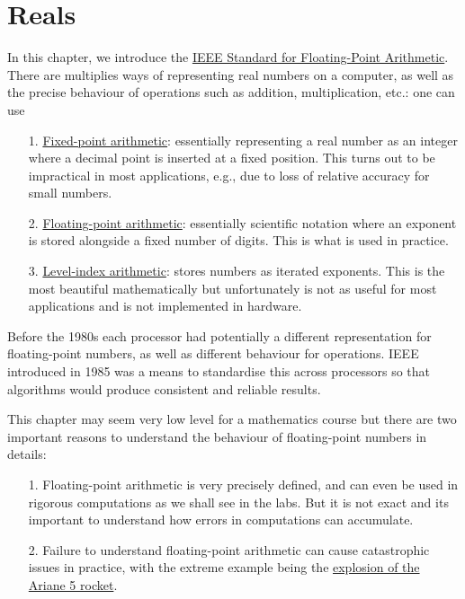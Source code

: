 
\section{Reals}
In this chapter, we introduce  the  \href{https://en.wikipedia.org/wiki/IEEE_754}{IEEE Standard for Floating-Point Arithmetic}. There are multiplies ways of representing real numbers on a computer, as well as  the precise behaviour of operations such as addition, multiplication, etc.: one can use

\begin{itemize}
\item[1. ] \href{https://en.wikipedia.org/wiki/Fixed-point_arithmetic}{Fixed-point arithmetic}: essentially representing a real number as an integer where a decimal point is inserted at a fixed position. This turns out to be impractical in most applications, e.g., due to loss of relative accuracy for small numbers.


\item[2. ] \href{https://en.wikipedia.org/wiki/Floating-point_arithmetic}{Floating-point arithmetic}: essentially scientific notation where an exponent is stored alongside a fixed number of digits. This is what is used in practice.


\item[3. ] \href{https://en.wikipedia.org/wiki/Symmetric_level-index_arithmetic}{Level-index arithmetic}: stores numbers as iterated exponents. This is the most beautiful mathematically but unfortunately is not as useful for most applications and is not implemented in hardware.

\end{itemize}
Before the 1980s each processor had potentially a different representation for  floating-point numbers, as well as different behaviour for operations.  IEEE introduced in 1985 was a means to standardise this across processors so that algorithms would produce consistent and reliable results.

This chapter may seem very low level for a mathematics course but there are two important reasons to understand the behaviour of floating-point numbers in details:

\begin{itemize}
\item[1. ] Floating-point arithmetic is very precisely defined, and can even be used in rigorous computations as we shall see in the labs. But it is not exact and its important to understand how errors in computations can accumulate.


\item[2. ] Failure to understand floating-point arithmetic can cause catastrophic issues in practice, with the extreme example being the  \href{https://youtu.be/N6PWATvLQCY?t=86}{explosion of the Ariane 5 rocket}.

\end{itemize}
